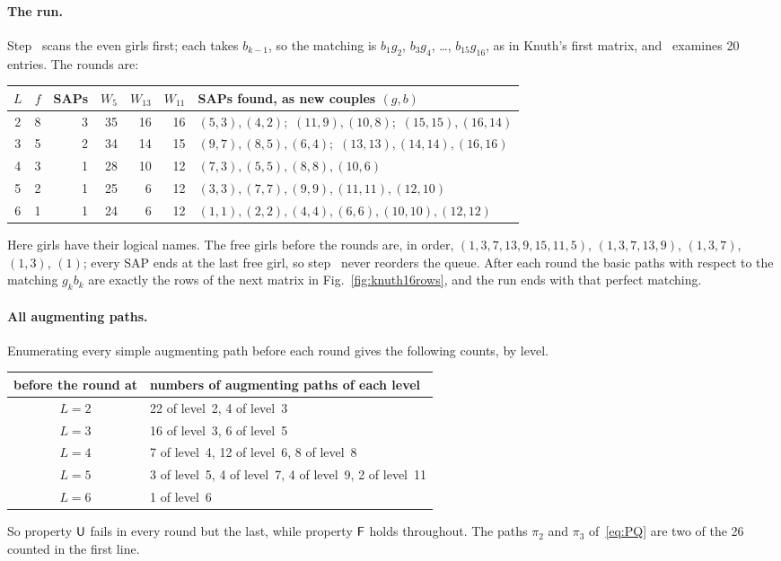 \paragraph{The run.} Step~ scans the even girls first; each takes
$b_{k-1}$, so the matching is $b_1g_2$, $b_3g_4$, \dots, $b_{15}g_{16}$, as in
Knuth's first matrix, and~ examines 20 entries. The rounds are:
\begin{center}\small
\begin{tabular}{crrrrrl}
\toprule
$L$&$f$&SAPs&$W_5$&$W_{13}$&$W_{11}$&SAPs found, as new couples $(g,b)$\\
\midrule
2&8&3&35&16&16&$(5,3),(4,2)$;\ $(11,9),(10,8)$;\ $(15,15),(16,14)$\\
3&5&2&34&14&15&$(9,7),(8,5),(6,4)$;\ $(13,13),(14,14),(16,16)$\\
4&3&1&28&10&12&$(7,3),(5,5),(8,8),(10,6)$\\
5&2&1&25&6&12&$(3,3),(7,7),(9,9),(11,11),(12,10)$\\
6&1&1&24&6&12&$(1,1),(2,2),(4,4),(6,6),(10,10),(12,12)$\\
\bottomrule
\end{tabular}
\end{center}
Here girls have their logical names. The free girls before the rounds are,
in  order, $(1,3,7,13,9,15,11,5)$, $(1,3,7,13,9)$, $(1,3,7)$,
$(1,3)$, $(1)$; every SAP ends at the last free girl, so step~ never
reorders the queue. After each round the basic paths with respect to the
matching $g_kb_k$ are exactly the rows of the next matrix in
Fig.~\ref{fig:knuth16rows}, and the run ends with that perfect matching.

\paragraph{All augmenting paths.} Enumerating every simple augmenting path
before each round gives the following counts, by level.
\begin{center}\small
\begin{tabular}{cl}
\toprule
before the round at&numbers of augmenting paths of each level\\
\midrule
$L=2$&22 of level~2, 4 of level~3\\
$L=3$&16 of level~3, 6 of level~5\\
$L=4$&7 of level~4, 12 of level~6, 8 of level~8\\
$L=5$&3 of level~5, 4 of level~7, 4 of level~9, 2 of level~11\\
$L=6$&1 of level~6\\
\bottomrule
\end{tabular}
\end{center}
So property $\mathsf U$ fails in every round but the last, while property
$\mathsf F$ holds throughout. The paths $\pi_2$ and $\pi_3$ of~\eqref{eq:PQ} are two of
the 26 counted in the first line.
